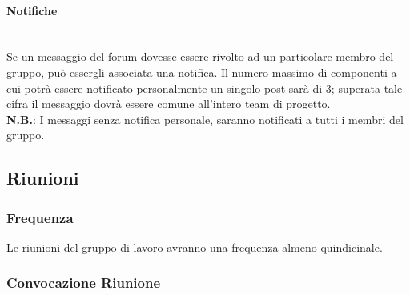 \paragraph{Notifiche}\mbox{}\\
Se un messaggio del forum dovesse essere rivolto ad un particolare membro del gruppo, può essergli associata una notifica. Il numero massimo di componenti a cui potrà essere notificato personalmente un singolo post sarà di 3; superata tale cifra il messaggio dovrà essere comune all'intero team di progetto.\\
\textbf{N.B.}: I messaggi senza notifica personale, saranno notificati a tutti i membri del gruppo.

\subsection{Riunioni}

\subsubsection{Frequenza}

Le riunioni del gruppo di lavoro avranno una frequenza almeno quindicinale.

\subsubsection{Convocazione Riunione}
